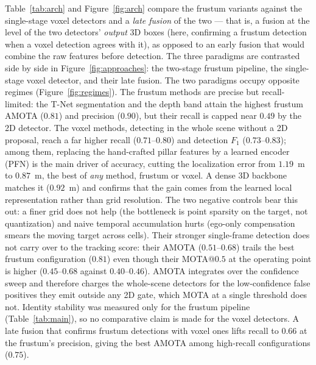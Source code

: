 Table~\ref{tab:arch} and Figure~\ref{fig:arch} compare the frustum variants
against the single-stage voxel detectors and a \emph{late fusion} of the two ---
that is, a fusion at the level of the two detectors' \emph{output} 3D boxes
(here, confirming a frustum detection when a voxel detection agrees with it),
as opposed to an early fusion that would combine the raw features before
detection. The three
paradigms are contrasted side by side in Figure~\ref{fig:approaches}: the
two-stage frustum pipeline, the single-stage voxel detector, and their late
fusion. The two
paradigms occupy opposite regimes (Figure~\ref{fig:regimes}). The frustum methods
are precise but recall-limited: the T-Net segmentation and the depth band attain
the highest frustum AMOTA ($0.81$) and precision ($0.90$), but their recall is
capped near $0.49$ by the 2D detector. The voxel methods, detecting in the whole
scene without a 2D proposal, reach a far higher recall ($0.71$--$0.80$) and
detection $F_1$ ($0.73$--$0.83$); among them, replacing the hand-crafted pillar
features by a learned encoder (PFN) is the main driver of accuracy, cutting the
localization error from $1.19$~m to $0.87$~m, the best of \emph{any} method,
frustum or voxel. A dense 3D backbone matches it ($0.92$~m) and confirms that the
gain comes from the learned local representation rather than grid resolution. The
two negative controls bear this out: a finer grid does not help (the bottleneck is
point sparsity on the target, not quantization) and naive temporal accumulation
hurts (ego-only compensation smears the moving target across cells). Their
stronger single-frame detection does not carry over to the tracking score: their
AMOTA ($0.51$--$0.68$) trails the best frustum configuration ($0.81$) even though
their MOTA@$0.5$ at the operating point is higher ($0.45$--$0.68$ against
$0.40$--$0.46$). AMOTA integrates over the confidence sweep and therefore charges
the whole-scene detectors for the low-confidence false positives they emit outside
any 2D gate, which MOTA at a single threshold does not. Identity stability was
measured only for the frustum pipeline (Table~\ref{tab:main}), so no comparative
claim is made for the voxel detectors. A late fusion that confirms frustum detections with voxel ones lifts
recall to $0.66$ at the frustum's precision, giving the best AMOTA among
high-recall configurations ($0.75$).

